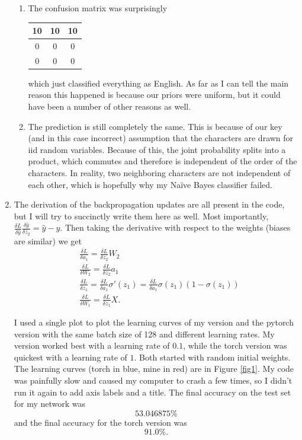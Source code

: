 \documentclass[a4paper]{article}
\theoremstyle{definition}
\begin{document}
\begin{enumerate}
\begin{enumerate}
		\item The confusion matrix was surprisingly
		
		\begin{tabular}{|c|c|c|}
			\hline
			10 & 10 & 10\\
			\hline
			0 & 0 & 0\\
			\hline
			0 & 0 & 0\\
			\hline
		\end{tabular}
	
	which just classified everything as English. As far as I can tell the main reason this happened is because our priors were uniform, but it could have been a number of other reasons as well.
	
	\item The prediction is still completely the same. This is because of our key (and in this case incorrect) assumption that the characters are drawn for iid random variables. Because of this, the joint probability splits into a product, which commutes and therefore is independent of the order of the characters. In reality, two neighboring characters are not independent of each other, which is hopefully why my Na\"ive Bayes classifier failed.
	\end{enumerate}
	
	
	
	\item The derivation of the backpropagation updates are all present in the code, but I will try to succinctly write them here as well. Most importantly, $ \frac{\delta L}{\delta \hat y} \frac{\delta \hat y}{\delta z_2} = \hat y - y $. Then taking the derivative with respect to the weights (biases are similar) we get
	\begin{align*}
		&\frac{\delta L}{\delta a_1} = \frac{\delta L}{\delta z_2} W_2 \\
		&\frac{\delta L}{\delta W_2} = \frac{\delta L}{\delta z_2} a_1 \\
		&\frac{\delta L}{\delta z_1} = \frac{\delta L}{\delta a_1} \sigma'(z_1) = \frac{\delta L}{\delta a_1} \sigma(z_1)(1-\sigma(z_1))\\
		&\frac{\delta L}{\delta W_1} = \frac{\delta L}{\delta z_1} X.
	\end{align*}
	
	I used a single plot to plot the learning curves of my version and the pytorch version with the same batch size of 128 and different learning rates. My version worked best with a learning rate of $ 0.1 $, while the torch version was quickest with a learning rate of $ 1 $. Both started with random initial weights. The learning curves (torch in blue, mine in red) are in Figure \ref{fig1}. My code was painfully slow and caused my computer to crash a few times, so I didn't run it again to add axis labels and a title. The final accuracy on the test set for my network was
	\[ 53.046875\% \]
	and the final accuracy for the torch version was 
	\[ 91.0\%. \]
	

\end{enumerate}
\end{document}
